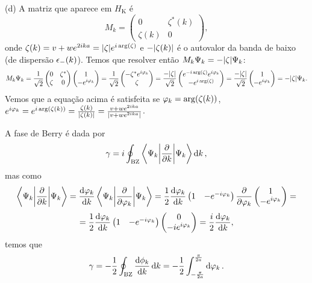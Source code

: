\documentclass[a4paper,10pt]{article}
\begin{document}
(d) A matriz que aparece em $H_{\text{K}}$ é
\begin{equation} \label{eq:matriz}
M_k =
\begin{pmatrix}
0 & \zeta^*(k) \\
\zeta(k) & 0
\end{pmatrix},
\end{equation}
onde $\zeta(k) = v + w e^{2ika} = \abs{\zeta} e^{i\arg(\zeta)}$ e $- \abs{\zeta(k)}$ é o autovalor da banda de baixo (de dispersão $\epsilon_-(k)$). Temos que resolver então $M_k\Psi_k = -\abs{\zeta} \Psi_k$:
$$
M_k \Psi_k =
\frac{1}{\sqrt{2}}
\begin{pmatrix}
0 & \zeta^* \\
\zeta & 0
\end{pmatrix}
\begin{pmatrix}
1 \\ -e^{i\varphi_k}
\end{pmatrix}
=
\frac{1}{\sqrt{2}}
\begin{pmatrix}
-\zeta^* e^{i\varphi_k} \\ \zeta
\end{pmatrix}
=
\frac{-\abs{\zeta}}{\sqrt{2}}
\begin{pmatrix}
e^{-i\arg(\zeta)} e^{i\varphi_k} \\ -e^{i\arg(\zeta)}
\end{pmatrix}
=
\frac{-\abs{\zeta}}{\sqrt{2}}
\begin{pmatrix}
1 \\ -e^{i\varphi_k}
\end{pmatrix}
=
-\abs{\zeta} \Psi_k.
$$
Vemos que a equação acima é satisfeita se $\varphi_k=\arg(\zeta(k))$, $e^{i \varphi_k} = e^{i \arg(\zeta(k))} = \frac{\zeta(k)}{\abs{\zeta(k)}} = \frac{v + w e^{2ika}}{\abs{v+we^{2ika}}}$.

A fase de Berry é dada por
$$
\gamma = i \oint_{\text{BZ}} \ev**{\pdv{k}}{\Psi_k} \dd{k},
$$
mas como
$$
\ev**{\pdv{k}}{\Psi_k} = \dv{\vphi_k}{k} \ev**{\pdv{\vphi_k}}{\Psi_k} =
\frac{1}{2} \dv{\vphi_k}{k}
\begin{pmatrix}
1 & -e^{-i\vphi_k}
\end{pmatrix}
\pdv{\vphi_k}
\begin{pmatrix}
1 \\ -e^{i\vphi_k}
\end{pmatrix}
= $$
$$
= \frac{1}{2} \dv{\varphi_k}{k}
\begin{pmatrix}
1 & -e^{-i\varphi_k}
\end{pmatrix}
\begin{pmatrix}
0 \\ - i e^{i\varphi_k}
\end{pmatrix} = \frac{i}{2} \dv{\varphi_k}{k},
$$
temos que
$$
\gamma = - \frac{1}{2} \oint_{\text{BZ}} \dv{\phi_k}{k} \dd{k} = - \frac{1}{2} \int_{-\frac{\pi}{2a}}^{\frac{\pi}{2a}} \dd{\varphi_k}.
$$
\end{document}
